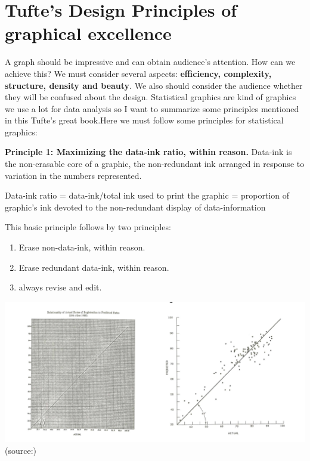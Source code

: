 \documentclass[]{book}
\providecommand{\tightlist}{%
  \setlength{\itemsep}{0pt}\setlength{\parskip}{0pt}}
\theoremstyle{definition}
\theoremstyle{definition}
\theoremstyle{definition}
\theoremstyle{remark}
\begin{document}
\section{Tufte's Design Principles of graphical
excellence}\label{tuftes-design-principles-of-graphical-excellence}

A graph should be impressive and can obtain audience's attention. How
can we achieve this? We must consider several aspects:
\textbf{efficiency, complexity, structure, density and beauty}. We also
should consider the audience whether they will be confused about the
design. Statistical graphics are kind of graphics we use a lot for data
analysis so I want to summarize some principles mentioned in this
Tufte's great book.Here we must follow some principles for statistical
graphics:

\textbf{Principle 1: Maximizing the data-ink ratio, within reason.}
Data-ink is the non-erasable core of a graphic, the non-redundant ink
arranged in response to variation in the numbers represented.

Data-ink ratio = data-ink/total ink used to print the graphic =
proportion of graphic's ink devoted to the non-redundant display of
data-information

This basic principle follows by two principles:

\begin{enumerate}
\def\labelenumi{\arabic{enumi}.}
\tightlist
\item
  Erase non-data-ink, within reason.
\item
  Erase redundant data-ink, within reason.
\item
  always revise and edit.
\end{enumerate}

\includegraphics{images/Tufte_figure1.png} (source:\citep{Tufte_2001})
\end{document}
